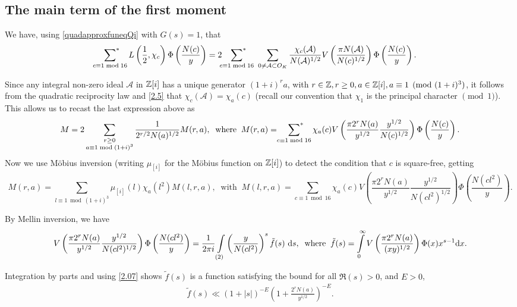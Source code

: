 \documentclass[twoside,leqno,10pt, A4]{amsart}
\begin{document}
\subsection{The main term of the first moment}

We have, using \eqref{quadapproxfuneqQi} with $G(s)=1$, that
\begin{align*} 
   \sideset{}{^*}\sum_{c \equiv 1 \bmod {16}}L \left( \frac{1}{2},
   \chi_c \right) \Phi\left( \frac{N(c)}{y} \right) &=2\sideset{}{^*}\sum_{c \equiv 1 \bmod {16}} \ \sum_{0 \neq \mathcal{A} \subset
  O_K} \frac{\chi_c(\mathcal{A})}{N(\mathcal{A})^{1/2}}V \left(\frac{\pi N(\mathcal{A}) }{N(c)^{1/2}} \right)\Phi\left( \frac{N(c)}{y} \right).
\end{align*}

   Since any integral non-zero ideal $\mathcal{A}$ in $\mathbb Z[i]$ has a unique generator
$(1+i)^ra$, with $r \in \mathbb{Z}, r \geq 0 , a \in \mathbb{Z}[i], a \equiv 1 \pmod
{(1+i)^3}$, it follows from the quadratic reciprocity law and \eqref{2.5} that
$\chi_{c}(\mathcal{A}) = \chi_a(c)$ (recall our convention that $\chi_1$ is the principal character $\pmod 1$). This allows us to recast the last expression above as
\[  M= 2 \sum_{\substack{r \geq 0 \\ a \equiv 1 \bmod {(1+i)^3}}} \frac{1}{2^{r/2}N(a)^{1/2}}M(r,a),
\; \; \mbox{where} \; \; M(r,a)= \sideset{}{^*}\sum_{c \equiv 1 \bmod {16}}\chi_a(c)V\left( \frac{\pi 2^rN(a)}{y^{1/2}} \frac{y^{1/2}}{N(c)^{1/2}} \right ) \Phi\left( \frac{N(c)}{y} \right). \]
  Now we use M\"obius inversion (writing $\mu_{[i]}$ for the M\"obius function on $\mathbb Z[i]$) to detect the
condition that $c$ is square-free, getting
\[   M(r,a)= \sum_{l \equiv 1 \bmod {(1+i)^3}}\mu_{[i]}(l)\chi_a(l^2) M(l,r,a), \; \; \mbox{with} \; \;   M(l,r,a)= \sum_{c \equiv 1 \bmod {16}}\chi_a(c)V \left( \frac{\pi 2^{r}N(a)}{y^{1/2}} \frac{y^{1/2}}{N(cl^2)^{1/2}} \right )\Phi\left( \frac{N(cl^2)}{y} \right). \]

    By Mellin inversion, we have
\[  V \left( \frac{\pi 2^rN(a)}{y^{1/2}} \frac{y^{1/2}}{N(cl^2)^{1/2}} \right ) \Phi\left( \frac{N(cl^2)}{y} \right) = \frac 1{2\pi i}\int\limits_{(2)} \left( \frac{y}{N(cl^2)} \right)^s \tilde{f}(s) \ \mathrm{d} s, \; \; \mbox{where} \; \;  \tilde{f}(s)=\int\limits^{\infty}_{0}V \left( \frac{\pi 2^rN(a)}{(xy)^{1/2}} \right) \Phi(x) x^{s-1} \mathrm{d} x.
\]

Integration by parts and using \eqref{2.07} shows $\tilde{f}(s)$ is a function satisfying the bound for all $\Re(s) > 0$, and $E>0$,
\begin{align}
\label{3.1}
  \tilde{f}(s) \ll (1+|s|)^{-E} \left( 1+\frac{2^rN(a)}{y^{1/2}} \right)^{-E}.
\end{align}
\end{document}

